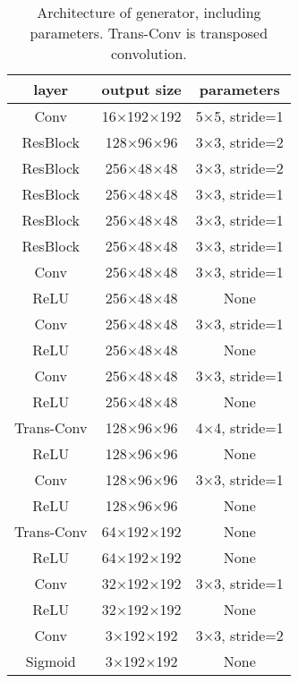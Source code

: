 \documentclass{article}
\begin{document}
\begin{table}[h] 
  \centering  
    \begin{tabular}{c|c|c}  
    \hline
    \textbf{layer} & \textbf{output size} & \textbf{parameters}\\ 
    \hline
      Conv & 16$\times$192$\times$192 & 5$\times$5, stride=1 \\
    \hline
      ResBlock & 128$\times$96$\times$96 & 3$\times$3, stride=2 \\
    \hline
      ResBlock & 256$\times$48$\times$48 & 3$\times$3, stride=2 \\
    \hline
      ResBlock & 256$\times$48$\times$48 & 3$\times$3, stride=1 \\
    \hline
      ResBlock & 256$\times$48$\times$48 & 3$\times$3, stride=1 \\
    \hline
      ResBlock & 256$\times$48$\times$48 & 3$\times$3, stride=1 \\
    \hline
      Conv & 256$\times$48$\times$48 & 3$\times$3, stride=1 \\
    \hline
      ReLU & 256$\times$48$\times$48 & None \\
    \hline
      Conv & 256$\times$48$\times$48 & 3$\times$3, stride=1 \\
    \hline
      ReLU & 256$\times$48$\times$48 & None \\
    \hline
      Conv & 256$\times$48$\times$48 & 3$\times$3, stride=1 \\
    \hline
      ReLU & 256$\times$48$\times$48 & None \\
    \hline
      Trans-Conv & 128$\times$96$\times$96 & 4$\times$4, stride=1 \\
    \hline
      ReLU & 128$\times$96$\times$96 & None \\
    \hline
      Conv & 128$\times$96$\times$96 & 3$\times$3, stride=1 \\
    \hline
      ReLU & 128$\times$96$\times$96 & None \\
    \hline
      Trans-Conv & 64$\times$192$\times$192 & None \\
    \hline
      ReLU & 64$\times$192$\times$192 & None \\
    \hline
      Conv & 32$\times$192$\times$192 & 3$\times$3, stride=1 \\
    \hline
      ReLU & 32$\times$192$\times$192 & None \\
    \hline
      Conv & 3$\times$192$\times$192 & 3$\times$3, stride=2 \\
    \hline
      Sigmoid & 3$\times$192$\times$192 & None \\
    \hline
    \end{tabular}
  
  \caption{Architecture of generator, including parameters. Trans-Conv is transposed convolution.} 
  \label{tab:1}
  \label{table1} 
\end{table}
\end{document}
